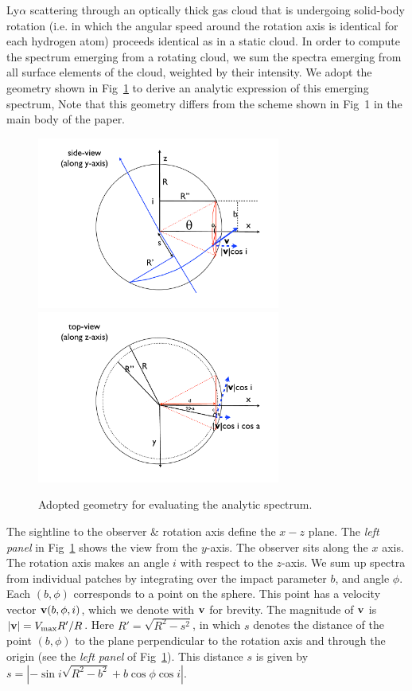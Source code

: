 Ly$\alpha$ scattering through an optically thick gas cloud that is
undergoing solid-body rotation (i.e. in which the angular speed around the
rotation axis is identical for each hydrogen atom) proceeds identical
as in a static cloud. In order to compute the spectrum emerging from a rotating cloud, we sum
the spectra emerging from all surface elements of the cloud, weighted by their intensity.
We adopt the geometry shown in Fig~\ref{fig:scheme} to derive an analytic expression of this emerging spectrum,
Note that this geometry differs from the scheme shown in Fig~1 in the main body of
the paper.
%
\begin{figure}[h]
\centerline{\includegraphics[width=80mm]{Figures/fig11a.pdf}
\includegraphics[width=80mm]{Figures/fig11b.pdf}}
\caption[]{Adopted geometry for evaluating the analytic spectrum.}
\label{fig:scheme}
\end{figure}
%
The sightline to the observer \& rotation axis define the $x-z$ plane.
The {\it left panel} in Fig~\ref{fig:scheme} shows the view from the $y$-axis.
The observer sits along the $x$ axis.
The rotation axis makes an angle $i$ with respect to the $z$-axis.
We sum up spectra from individual patches by integrating over the
impact parameter $b$, and angle $\phi$.
Each $(b,\phi)$ corresponds to a point on the sphere.
This point has a velocity vector ${\bf v}(b,\phi,i)$, which we denote
with ${\bf v}$ for brevity. The magnitude of ${\bf v}$ is $|{\bf v}|=V_{\rm max}R'/R$. Here $R'=\sqrt{R^2 -s^2}$, in which $s$ denotes the distance of the point $(b,\phi)$ to the plane perpendicular to the rotation axis and through the origin (see the {\it left panel} of Fig~\ref{fig:scheme}). This distance $s$ is given by $s=|-\sin i\sqrt{R^2-b^2}+ b \cos \phi \cos i|$.\\
